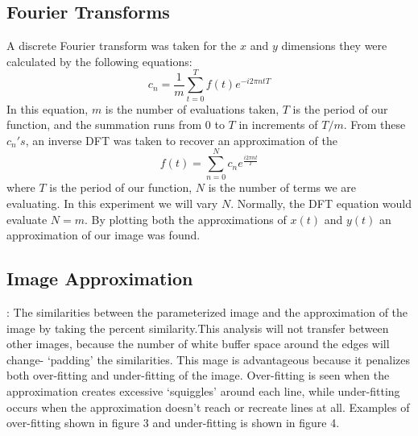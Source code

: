 \documentclass[psamsfonts]{amsart}
\theoremstyle{definition}
\theoremstyle{remark}
\numberwithin{equation}{section}
\begin{document}
\subsection{Fourier Transforms}
A discrete Fourier transform was taken for the $x$ and $y$ dimensions they were calculated by the following equations:
\begin{equation}\label{cn}
c_n = \frac{1}{m} \sum_{t=0}^T f(t)e^{{-i2\pi nt}{T}}
\end{equation}
In this equation, $m$ is the number of evaluations taken, $T$ is the period of our function, and the summation runs from $0$ to $T$ in increments of $T/m$.
From these $c_n's$, an inverse DFT was taken to recover an approximation of the 
\begin{equation}\label{ft}
f(t) = \sum_{n=0}^N c_ne^{\frac{i2\pi nt}{T}}
\end{equation}
 where $T$ is the period of our function, $N$ is the number of terms we are evaluating. In this experiment we will vary $N$. Normally, the DFT equation would evaluate $N=m$. By plotting both the approximations of $x(t)$ and $y(t)$ an approximation of our image was found. 
 
\subsection{Image Approximation}:
The similarities between the parameterized image and the approximation of the image by taking the percent similarity.This analysis will not transfer between other images, because the number of white buffer space around the edges will change- `padding' the similarities. This mage is advantageous because it penalizes both over-fitting and under-fitting of the image. Over-fitting is seen when the approximation creates excessive `squiggles' around each line, while under-fitting occurs when the approximation doesn't reach or recreate lines at all. Examples of over-fitting shown in figure 3 and under-fitting is shown in figure 4. 
\end{document}
